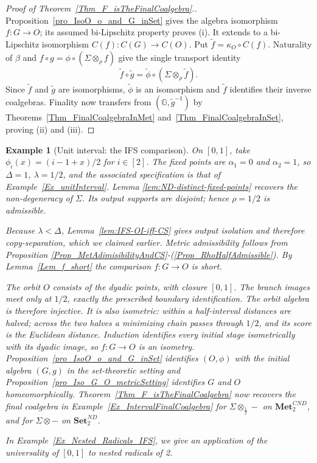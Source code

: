 \documentclass{sn-jnl}%
\theoremstyle{thmstyleone}%
\theoremstyle{thmstyletwo}%
\newtheorem{example}{Example}%
\theoremstyle{thmstylethree}%
\newcommand{\mcndk}[1]{\mathbf{Met}_{#1}^{CND}}
\newcommand{\setndk}[1]{\mathbf{Set}_{#1}^{ND}}
\newcommand{\M}{\Sigma}
\newcommand{\F}{\M\otimes}
\newcommand{\Fw}{\M\otimes_{\w}}
\newcommand{\Fww}[1]{\M\otimes_{#1}}
\newcommand{\G}{\mathbb{G}}
\newcommand{\g}{\tilde{g}^{-1}}
\newcommand{\f}{\phi}
\newcommand{\w}{\rho}
\newcommand{\ft}{\widetilde f}
\begin{document}
\begin{proof}[Proof of Theorem~\ref{Thm_F_isTheFinalCoalgebra}.]
Proposition~\ref{pro_IsoO_o_and_G_inSet} gives the algebra isomorphism $f:G\to O$; its assumed bi-Lipschitz property proves (i). It extends to a bi-Lipschitz isomorphism $C(f):C(G)\to C(O)$. Put $\widetilde f=\kappa_O\circ C(f)$. Naturality of $\beta$ and $f\circ g=\f\circ(\Fw f)$ give the single transport identity
\begin{equation} 
\nonumber
    \ft\circ\widetilde g = \widetilde{\f}\circ(\Fw\widetilde f).
\end{equation}
Since $\widetilde f$ and $\widetilde g$ are isomorphisms, $\widetilde{\f}$ is an isomorphism and $\widetilde f$ identifies their inverse coalgebras. Finality now transfers from $(\G,\g)$ by Theorems~\ref{Thm_FinalCoalgebraInMet} and~\ref{Thm_FinalCoalgebraInSet}, proving (ii) and (iii).
\end{proof}

\begin{example}[Unit interval: the IFS comparison]
\label{Ex_unitInterval_IFS}
    On $[0,1]$, take $\f_i(x)=(i-1+x)/2$ for $i\in[2]$. The fixed points are $\alpha_1=0$ and $\alpha_2=1$, so $\Delta=1$, $\lambda=1/2$, and the associated specification is that of Example~\ref{Ex_unitInterval}. Lemma \ref{lem:ND-distinct-fixed-points} recovers the non-degeneracy of $\Sigma$. Its output supports are disjoint; hence $\rho=1/2$ is admissible.

    Because $\lambda<\Delta$, Lemma~\ref{lem:IFS-OI-iff-CS} gives output isolation and therefore copy-separation, which we claimed earlier. Metric admissibility follows from Proposition \ref{Prop_MetAdimisibilityAndCS}-(\ref{Prop_RhoHalfAdmissible}). By Lemma~\ref{Lem_f_short} the comparison $f:G\to O$ is short. 

    The orbit $O$ consists of the dyadic points, with closure $[0,1]$. The branch images meet only at $1/2$, exactly the prescribed boundary identification. The orbit algebra is therefore injective. It is also isometric: within a half-interval distances are halved; across the two halves a minimizing chain passes through $1/2$, and its score is the Euclidean distance. Induction identifies every initial stage isometrically with its dyadic image, so $f:G\to O$ is an isometry. Proposition~\ref{pro_IsoO_o_and_G_inSet} identifies $(O,\f)$ with the initial algebra $(G,g)$ in the set-theoretic setting and Proposition~\ref{pro_Iso_G_O_metricSetting} identifies $G$ and $O$ homeomorphically. Theorem~\ref{Thm_F_isTheFinalCoalgebra} now recovers the final coalgebra in Example~\ref{Ex_IntervalFinalCoalgebra} for $\Fww{\frac12}-$ on $\mcndk{2}$, and for $\F-$ on $\setndk{2}$.   

    In Example~\ref{Ex_Nested_Radicals_IFS}, we give an application of the universality of $[0,1]$ to nested radicals of 2.
\end{example}
\end{document}
